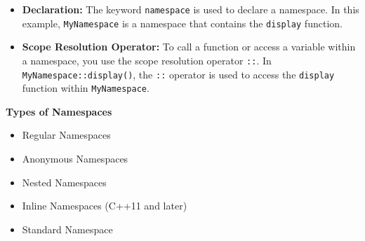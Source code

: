 \begin{itemize}
    \item \textbf{Declaration:} The keyword \texttt{namespace} is used to declare a namespace. In this example, \texttt{MyNamespace} is a namespace that contains the \texttt{display} function.
    \item \textbf{Scope Resolution Operator:} To call a function or access a variable within a namespace, you use the scope resolution operator \texttt{::}. In \texttt{MyNamespace::display()}, the \texttt{::} operator is used to access the \texttt{display} function within \texttt{MyNamespace}.
\end{itemize}

\textbf{Types of Namespaces}
\begin{itemize}
    \item Regular Namespaces
    \item Anonymous Namespaces
    \item Nested Namespaces
    \item Inline Namespaces (C++11 and later)
    \item Standard Namespace
\end{itemize}

\subsection{}
\subsection{}
\subsection{}
\subsection{}